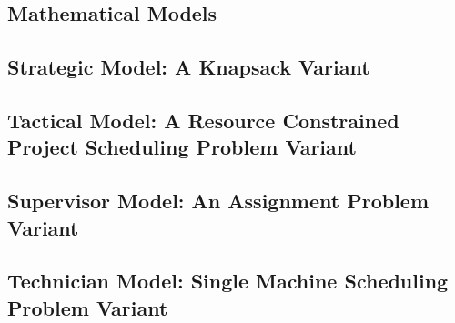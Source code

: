 \subsection{Mathematical Models}
\subsection{Strategic Model: A Knapsack Variant}
\label{sec:model:strategic}

\strategicmodel
\newpage
\subsection{Tactical Model: A Resource Constrained Project Scheduling Problem Variant}
\label{sec:model:tactical}

\newpage
\subsection{Supervisor Model: An Assignment Problem Variant}
\label{sec:model:supervisor}

\newpage
\subsection{Technician Model: Single Machine Scheduling Problem Variant}
\label{sec:model:technician}


